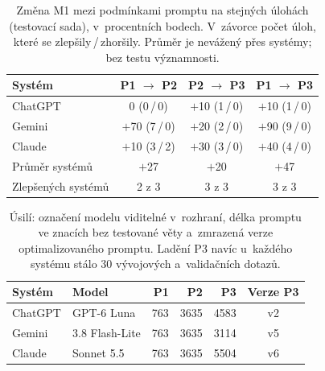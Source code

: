 \begin{table}[htbp]
\centering\small
\caption{Změna M1 mezi podmínkami promptu na stejných úlohách (testovací sada), v~procentních bodech. V~závorce počet úloh, které se zlepšily\,/\,zhoršily. Průměr je nevážený přes systémy; bez testu významnosti.}
\label{tab:efekt-promptu}
\begin{tabular}{@{}lccc@{}}
\toprule
Systém & P1 $\rightarrow$ P2 & P2 $\rightarrow$ P3 & P1 $\rightarrow$ P3 \\
\midrule
ChatGPT & 0 (0\,/\,0) & $+$10 (1\,/\,0) & $+$10 (1\,/\,0) \\
Gemini & $+$70 (7\,/\,0) & $+$20 (2\,/\,0) & $+$90 (9\,/\,0) \\
Claude & $+$10 (3\,/\,2) & $+$30 (3\,/\,0) & $+$40 (4\,/\,0) \\
\midrule
Průměr systémů & $+$27 & $+$20 & $+$47 \\
Zlepšených systémů & 2 z 3 & 3 z 3 & 3 z 3 \\
\bottomrule
\end{tabular}
\end{table}

\begin{table}[htbp]
\centering\small
\caption{Úsilí: označení modelu viditelné v~rozhraní, délka promptu ve znacích bez testované věty a~zmrazená verze optimalizovaného promptu. Ladění P3 navíc u~každého systému stálo 30 vývojových a~validačních dotazů.}
\label{tab:usili}
\begin{tabular}{@{}llrrrc@{}}
\toprule
Systém & Model & P1 & P2 & P3 & Verze P3 \\
\midrule
ChatGPT & GPT-6 Luna & 763 & 3635 & 4583 & v2 \\
Gemini & 3.8 Flash-Lite & 763 & 3635 & 3114 & v5 \\
Claude & Sonnet 5.5 & 763 & 3635 & 5504 & v6 \\
\bottomrule
\end{tabular}
\end{table}
